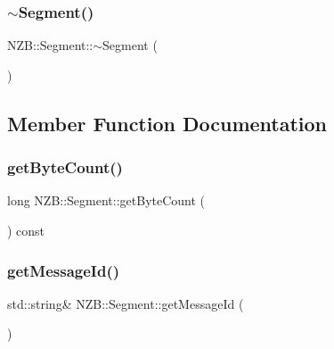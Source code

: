 \hypertarget{class_n_z_b_1_1_segment_a998df54e19e246e18669e5a876028383}{}\label{class_n_z_b_1_1_segment_a998df54e19e246e18669e5a876028383} 
\subsubsection{\texorpdfstring{$\sim$\+Segment()}{~Segment()}}
{\footnotesize\ttfamily N\+Z\+B\+::\+Segment\+::$\sim$\+Segment (\begin{DoxyParamCaption}{ }\end{DoxyParamCaption})\hspace{0.3cm}{\ttfamily [inline]}}



\subsection{Member Function Documentation}
\hypertarget{class_n_z_b_1_1_segment_adeefb2996c75fec8f30191455520910f}{}\label{class_n_z_b_1_1_segment_adeefb2996c75fec8f30191455520910f} 
\subsubsection{\texorpdfstring{get\+Byte\+Count()}{getByteCount()}}
{\footnotesize\ttfamily long N\+Z\+B\+::\+Segment\+::get\+Byte\+Count (\begin{DoxyParamCaption}{ }\end{DoxyParamCaption}) const\hspace{0.3cm}{\ttfamily [inline]}}

\hypertarget{class_n_z_b_1_1_segment_a669b3f6b39250f3cf04f0a1cf3ad2a0d}{}\label{class_n_z_b_1_1_segment_a669b3f6b39250f3cf04f0a1cf3ad2a0d} 
\subsubsection{\texorpdfstring{get\+Message\+Id()}{getMessageId()}\hspace{0.1cm}{\footnotesize\ttfamily [1/2]}}
{\footnotesize\ttfamily std\+::string\& N\+Z\+B\+::\+Segment\+::get\+Message\+Id (\begin{DoxyParamCaption}{ }\end{DoxyParamCaption})\hspace{0.3cm}{\ttfamily [inline]}}

